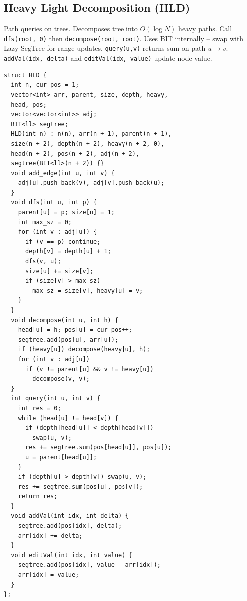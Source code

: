 \subsection{Heavy Light Decomposition (HLD)}
Path queries on trees. Decomposes tree into $O(\log N)$ heavy paths. Call \texttt{dfs(root, 0)} then \texttt{decompose(root, root)}. Uses BIT internally -- swap with Lazy SegTree for range updates. \texttt{query(u,v)} returns sum on path $u \to v$. \texttt{addVal(idx, delta)} and \texttt{editVal(idx, value)} update node value.
\begin{verbatim}
struct HLD {
  int n, cur_pos = 1;
  vector<int> arr, parent, size, depth, heavy,
  head, pos;
  vector<vector<int>> adj;
  BIT<ll> segtree;
  HLD(int n) : n(n), arr(n + 1), parent(n + 1),
  size(n + 2), depth(n + 2), heavy(n + 2, 0),
  head(n + 2), pos(n + 2), adj(n + 2),
  segtree(BIT<ll>(n + 2)) {}
  void add_edge(int u, int v) {
    adj[u].push_back(v), adj[v].push_back(u);
  }
  void dfs(int u, int p) {
    parent[u] = p; size[u] = 1;
    int max_sz = 0;
    for (int v : adj[u]) {
      if (v == p) continue;
      depth[v] = depth[u] + 1;
      dfs(v, u);
      size[u] += size[v];
      if (size[v] > max_sz)
        max_sz = size[v], heavy[u] = v;
    }
  }
  void decompose(int u, int h) {
    head[u] = h; pos[u] = cur_pos++;
    segtree.add(pos[u], arr[u]);
    if (heavy[u]) decompose(heavy[u], h);
    for (int v : adj[u])
      if (v != parent[u] && v != heavy[u])
        decompose(v, v);
  }
  int query(int u, int v) {
    int res = 0;
    while (head[u] != head[v]) {
      if (depth[head[u]] < depth[head[v]])
        swap(u, v);
      res += segtree.sum(pos[head[u]], pos[u]);
      u = parent[head[u]];
    }
    if (depth[u] > depth[v]) swap(u, v);
    res += segtree.sum(pos[u], pos[v]);
    return res;
  }
  void addVal(int idx, int delta) {
    segtree.add(pos[idx], delta);
    arr[idx] += delta;
  }
  void editVal(int idx, int value) {
    segtree.add(pos[idx], value - arr[idx]);
    arr[idx] = value;
  }
};
\end{verbatim}
